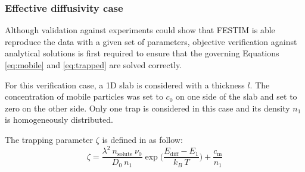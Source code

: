 \subsubsection{Effective diffusivity case} \label{analytical}

Although validation against experiments could show that FESTIM is able reproduce the data with a given set of parameters, objective verification against analytical solutions is first required to ensure that the governing Equations \ref{eq:mobile} and \ref{eq:trapped} are solved correctly.

For this verification case, a 1D slab is considered with a thickness $l$.
The concentration of mobile particles was set to $c_0$ on one side of the slab and set to zero on the other side.
Only one trap is considered in this case and its density $n_1$ is homogeneously distributed.

The trapping parameter $\zeta$ is defined in  as follow:
\begin{equation}
    \zeta = \frac{\lambda^2 \: n_\mathrm{solute} \: \nu_0}{D_0 \: n_1}\exp\bigg(\frac{E_\mathrm{diff} - E_1}{k_B \: T}\bigg) + \frac{c_\mathrm{m}}{n_1}
\end{equation}

